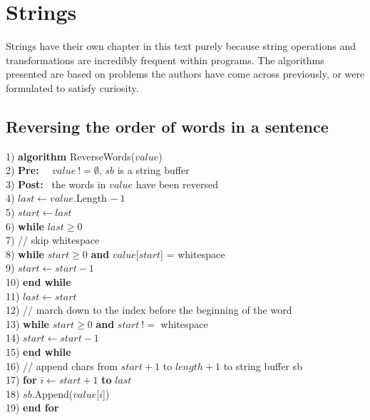 \chapter{Strings}
Strings have their own chapter in this text purely because string operations and transformations are incredibly frequent within programs. The algorithms presented are based on problems the authors have come across previously, or were formulated to satisfy curiosity.

\section{Reversing the order of words in a sentence}

\begin{tabbing}
1) \textbf{alg}\= \textbf{orithm} ReverseWords($value$) \\
2) \> \textbf{Pre:}~~ $value~!= \emptyset$, $sb$ is a string buffer \\
3) \> \textbf{Post:}~ the words in $value$ have been reversed \\
4) \> $last \leftarrow value$.Length $-~1$ \\
5) \> $start \leftarrow last$ \\
6) \> \textbf{whi}\= \textbf{le} $last \geq 0$ \\
7) \> \> // skip whitespace \\
8) \> \> \textbf{whi}\= \textbf{le} $start \geq 0$ \textbf{and} $value$[$start$] = whitespace \\
9) \> \> \> $start \leftarrow start - 1$ \\
10)\> \> \textbf{end while} \\
11)\> \> $last \leftarrow start$ \\
12)\> \> // march down to the index before the beginning of the word \\
13)\> \> \textbf{while} $start \geq 0$ \textbf{and} $start~!=$ whitespace \\
14)\> \> \> $start \leftarrow start - 1$ \\
15)\> \> \textbf{end while} \\
16)\> \> // append chars from $start + 1$ to $length + 1$ to string buffer sb \\
17)\> \> \textbf{for} $i \leftarrow start + 1$ \textbf{to} $last$ \\
18)\> \> \> $sb$.Append($value$[$i$]) \\
19)\> \> \textbf{end for} \\

\end{tabbing}
